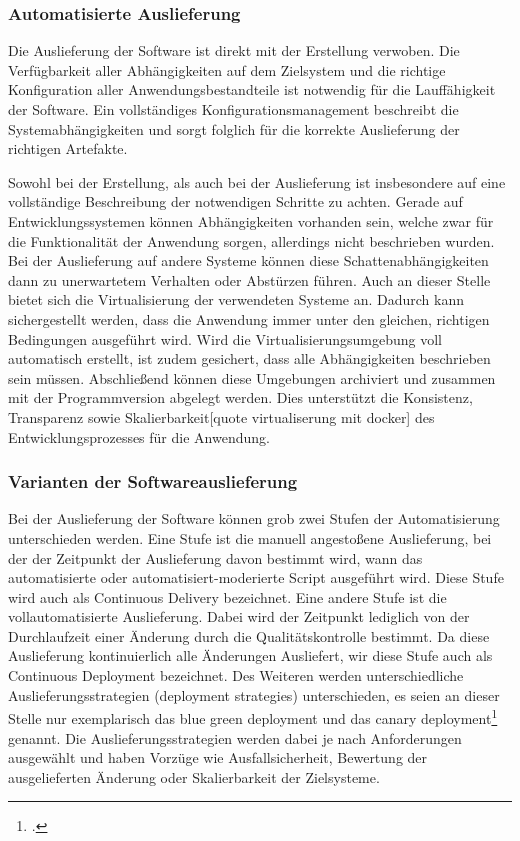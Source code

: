 \subsubsection{Automatisierte Auslieferung}

Die Auslieferung der Software ist direkt mit der Erstellung verwoben. Die Verfügbarkeit aller Abhängigkeiten auf dem 
Zielsystem und die richtige Konfiguration aller Anwendungsbestandteile ist notwendig für die Lauffähigkeit der Software. 
Ein vollständiges Konfigurationsmanagement beschreibt die Systemabhängigkeiten und sorgt folglich für die korrekte 
Auslieferung der richtigen Artefakte.

Sowohl bei der Erstellung, als auch bei der Auslieferung ist insbesondere auf eine vollständige Beschreibung der 
notwendigen Schritte zu achten. Gerade auf Entwicklungssystemen können Abhängigkeiten vorhanden sein, welche zwar für die 
Funktionalität der Anwendung sorgen, allerdings nicht beschrieben wurden. Bei der Auslieferung auf andere Systeme können 
diese \glqq Schattenabhängigkeiten\grqq{} dann zu unerwartetem Verhalten oder Abstürzen führen.
Auch an dieser Stelle bietet sich die Virtualisierung der verwendeten Systeme an. Dadurch kann sichergestellt werden, 
dass die Anwendung immer unter den gleichen, richtigen Bedingungen ausgeführt wird. Wird die Virtualisierungsumgebung 
voll automatisch erstellt, ist zudem gesichert, dass alle Abhängigkeiten beschrieben sein müssen.
Abschließend können diese Umgebungen archiviert und zusammen mit der Programmversion abgelegt werden. Dies unterstützt 
die Konsistenz, Transparenz sowie Skalierbarkeit[quote virtualiserung mit docker] des Entwicklungsprozesses für die 
Anwendung.

\subsubsection{Varianten der Softwareauslieferung}

Bei der Auslieferung der Software können grob zwei Stufen der Automatisierung unterschieden werden. Eine Stufe ist die 
manuell angestoßene Auslieferung, bei der der Zeitpunkt der Auslieferung davon bestimmt wird, wann das automatisierte 
oder automatisiert-moderierte Script ausgeführt wird. Diese Stufe wird auch als \glqq Continuous Delivery\grqq{} bezeichnet. Eine andere Stufe ist die vollautomatisierte Auslieferung. Dabei wird der
Zeitpunkt lediglich von der Durchlaufzeit einer Änderung durch die Qualitätskontrolle bestimmt. Da diese Auslieferung kontinuierlich alle Änderungen Ausliefert, wir diese Stufe auch als \glqq Continuous Deployment\grqq{} bezeichnet.
Des Weiteren werden unterschiedliche Auslieferungsstrategien (\glqq deployment strategies\grqq{}) unterschieden, es seien an
dieser Stelle nur exemplarisch das \glqq blue green deployment\grqq{} und das \glqq canary deployment\grqq{}\footcite[261-264 Deploying and Releasing Applications][]
{humble2010} genannt. Die Auslieferungsstrategien werden dabei je nach Anforderungen ausgewählt und haben Vorzüge wie 
Ausfallsicherheit, Bewertung der ausgelieferten Änderung oder Skalierbarkeit der Zielsysteme.

